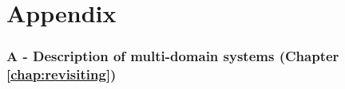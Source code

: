 \documentclass[12pt,a4paper,twoside]{report}
\theoremstyle{definition}
\begin{document}
	\doublespacing	

    

	

	

\tableofcontents

\newpage
\listoffigures

\newpage
\listoftables
\newpage
\printnomenclature
\newpage
	\onehalfspacing
	
	
	
	
	
	
	
	
	
\clearpage{}
{\linespread{0.7}\selectfont}

\clearpage{}

\chapter*{Appendix}

\subsection*{A - Description of multi-domain systems \label{ssec:implementation-details} (Chapter \ref{chap:revisiting})}
\end{document}
